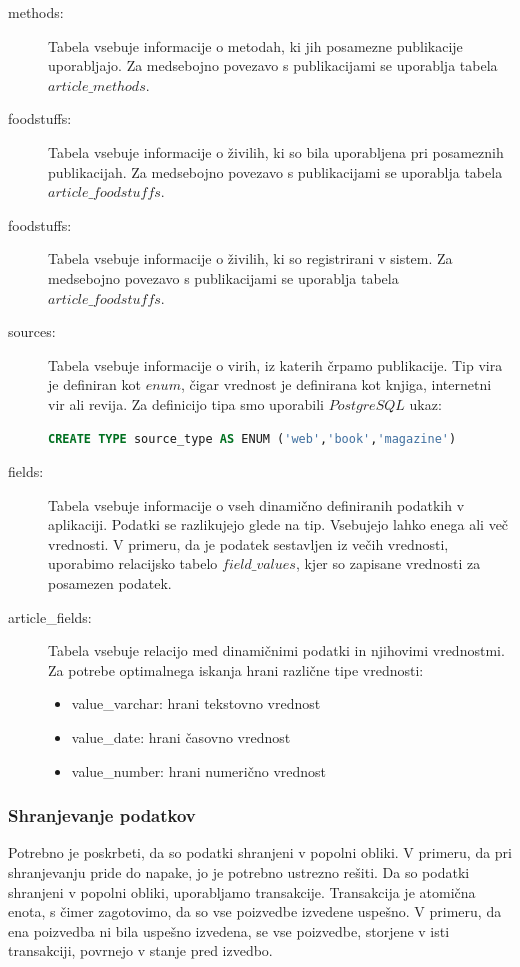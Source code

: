 \begin{description}
\item[methods:] Tabela vsebuje informacije o metodah, ki jih posamezne publikacije uporabljajo. Za medsebojno povezavo s publikacijami se uporablja tabela $article\_methods$.

\item[foodstuffs:] Tabela vsebuje informacije o živilih, ki so bila uporabljena pri posameznih publikacijah. Za medsebojno povezavo s publikacijami se uporablja tabela $article\_foodstuffs$.

\item[foodstuffs:] Tabela vsebuje informacije o živilih, ki so registrirani v sistem. Za medsebojno povezavo s publikacijami se uporablja tabela $article\_foodstuffs$.

\item[sources:] Tabela vsebuje informacije o virih, iz katerih črpamo publikacije. Tip vira je definiran kot $enum$, čigar vrednost je definirana kot knjiga, internetni vir ali revija. Za definicijo tipa smo uporabili $PostgreSQL$ ukaz:
\begin{lstlisting}[language=sql, style=mystyle]
CREATE TYPE source_type AS ENUM ('web','book','magazine')
\end{lstlisting}

\item[fields:] Tabela vsebuje informacije o vseh dinamično definiranih podatkih v aplikaciji. Podatki se razlikujejo glede na tip. Vsebujejo lahko enega ali več vrednosti. V primeru, da je podatek sestavljen iz večih vrednosti, uporabimo relacijsko tabelo $field\_values$, kjer so zapisane vrednosti za posamezen podatek.

\item[article\_fields:] Tabela vsebuje relacijo med dinamičnimi podatki in njihovimi vrednostmi. Za potrebe optimalnega iskanja hrani različne tipe vrednosti:
\begin{itemize}
\item value\_varchar: hrani tekstovno vrednost
\item value\_date: hrani časovno vrednost
\item value\_number: hrani numerično vrednost
\end{itemize}
\end{description}

\subsubsection{Shranjevanje podatkov}
Potrebno je poskrbeti, da so podatki shranjeni v popolni obliki. V primeru, da pri shranjevanju pride do napake, jo je potrebno ustrezno rešiti. Da so podatki shranjeni v popolni obliki, uporabljamo transakcije. Transakcija je atomična enota, s čimer zagotovimo, da so vse poizvedbe izvedene uspešno. V primeru, da ena poizvedba ni bila uspešno izvedena, se vse poizvedbe, storjene v isti transakciji, povrnejo v stanje pred izvedbo.

